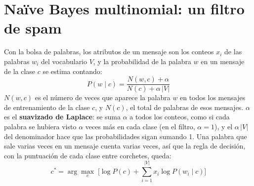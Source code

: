 \documentclass{article}
\begin{document}
\section{Naïve Bayes multinomial: un filtro de spam}
Con la bolsa de palabras, los atributos de un mensaje son los conteos $x_i$ de las palabras $w_i$ del vocabulario $V$, y la probabilidad de la palabra $w$ en un mensaje de la clase $c$ se estima contando:
\[
P(w \mid c) = \frac{N(w, c) + \alpha}{N(c) + \alpha\,|V|}
\]
$N(w, c)$ es el número de veces que aparece la palabra $w$ en todos los mensajes de entrenamiento de la clase $c$, y $N(c)$, el total de palabras de esos mensajes. $\alpha$ es el \textbf{suavizado de Laplace}: se suma $\alpha$ a todos los conteos, como si cada palabra se hubiera visto $\alpha$ veces más en cada clase (en el filtro, $\alpha = 1$), y el $\alpha\,|V|$ del denominador hace que las probabilidades sigan sumando 1. Una palabra que sale varias veces en un mensaje cuenta varias veces, así que la regla de decisión, con la puntuación de cada clase entre corchetes, queda:
\[
c^* = \arg\max_c \; \Big[ \log P(c) + \sum_{i=1}^{|V|} x_i \log P(w_i \mid c) \Big]
\]
\end{document}
